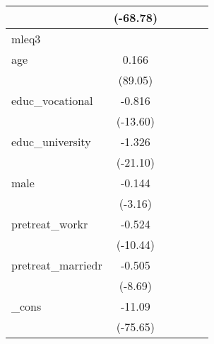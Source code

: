 {\begin{tabular}{l*{5}{c}}
            &    (-68.78)         &                     &                     &                     &                     \\
\hline
mleq3       &                     &                     &                     &                     &                     \\
age         &       0.166\sym{***}&                     &                     &                     &                     \\
            &     (89.05)         &                     &                     &                     &                     \\
[1em]
educ\_vocational&      -0.816\sym{***}&                     &                     &                     &                     \\
            &    (-13.60)         &                     &                     &                     &                     \\
[1em]
educ\_university&      -1.326\sym{***}&                     &                     &                     &                     \\
            &    (-21.10)         &                     &                     &                     &                     \\
[1em]
male        &      -0.144\sym{**} &                     &                     &                     &                     \\
            &     (-3.16)         &                     &                     &                     &                     \\
[1em]
pretreat\_workr&      -0.524\sym{***}&                     &                     &                     &                     \\
            &    (-10.44)         &                     &                     &                     &                     \\
[1em]
pretreat\_marriedr&      -0.505\sym{***}&                     &                     &                     &                     \\
            &     (-8.69)         &                     &                     &                     &                     \\
[1em]
\_cons      &      -11.09\sym{***}&                     &                     &                     &                     \\
            &    (-75.65)         &                     &                     &                     &                     \\

\end{tabular}}
